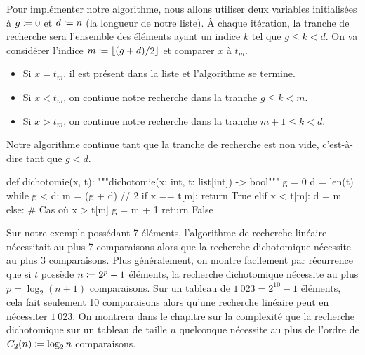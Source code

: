 \documentclass{magnolia}
\begin{document}
Pour implémenter notre algorithme, nous allons utiliser deux variables initialisées
à $g\coloneqq 0$ et $d\coloneqq n$ (la longueur de notre liste). À chaque itération, la tranche de recherche
 sera l'ensemble des éléments ayant un indice $k$ tel que $g\leq k<d$. On va considérer
l'indice $m \coloneqq \left\lfloor(g+d)/2\right\rfloor$ et comparer $x$ à $t_m$.
\begin{center}
\end{center}
\begin{itemize}
\item Si $x=t_m$, il est présent dans la liste et l'algorithme se termine.
\item Si $x<t_m$, on continue notre recherche dans la tranche $g\leq k < m$.
\item Si $x>t_m$, on continue notre recherche dans la tranche $m+1\leq k < d$.
\end{itemize}
Notre algorithme continue tant que la tranche de recherche est non vide, c'est-à-dire tant que $g<d$.

\begin{pythoncode}
def dichotomie(x, t):
    """dichotomie(x: int, t: list[int]) -> bool"""
    g = 0
    d = len(t)
    while g < d:
        m = (g + d) // 2
        if x == t[m]:
            return True
        elif x < t[m]:
            d = m
        else:              # Cas où x > t[m]
            g = m + 1
    return False
\end{pythoncode}
\noindent
Sur notre exemple possédant 7 éléments, l'algorithme de recherche linéaire nécessitait au plus 7 comparaisons alors
que la recherche dichotomique nécessite au plus 3 comparaisons. Plus généralement, on montre facilement
par récurrence que si $t$ possède $n\coloneqq 2^p-1$ éléments, la recherche dichotomique nécessite au plus
$p=\log_2(n+1)$ comparaisons. Sur un tableau de $1\ 023=2^{10}-1$ éléments, cela fait seulement 10 comparaisons
alors qu'une recherche linéaire peut en nécessiter $1\ 023$. On montrera dans le
chapitre sur la complexité que la recherche dichotomique
sur un tableau de taille $n$ quelconque nécessite au plus de l'ordre de $C_2(n)\coloneqq \log_2 n$ comparaisons.
\end{document}
